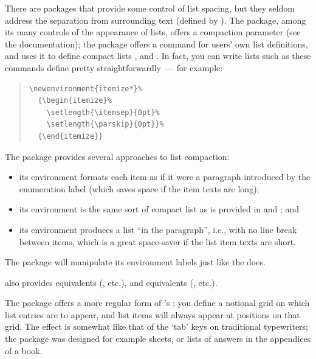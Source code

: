 There are packages that provide some control of list spacing, but they
seldom address the separation from surrounding text (defined by
).  The  package, among its many controls
of the appearance of  lists, offers a
compaction parameter (see the documentation); the 
package offers a  command for users' own list
definitions, and uses it to define compact lists
,  and
.  In fact, you can write lists such as
these commands define pretty straightforwardly~--- for example:
\begin{quote}
\begin{verbatim}
\newenvironment{itemize*}%
  {\begin{itemize}%
    \setlength{\itemsep}{0pt}%
    \setlength{\parskip}{0pt}}%
  {\end{itemize}}
\end{verbatim}
\end{quote}
The  package provides several approaches to list
compaction:
\begin{itemize}
\item its  environment formats each item as if
  it were a paragraph introduced by the enumeration label (which saves
  space if the item texts are long);
\item its  environment is the same sort of
  compact list as is provided in  and
  ; and
\item its  environment produces a list ``in
  the paragraph'', i.e., with no line break between items, which is a
  great space-saver if the list item texts are short.
\end{itemize}
The package will manipulate its  environment
labels just like the 
does.

 also provides  equivalents
(, etc.), and 
equivalents (, etc.).

The  package offers a more regular form of
's ; you define a notional
grid on which list entries are to appear, and list items will always
appear at positions on that grid.  The effect is somewhat like that of
the `tab' keys on traditional typewriters; the package was designed
for example sheets, or lists of answers in the appendices of a book.

